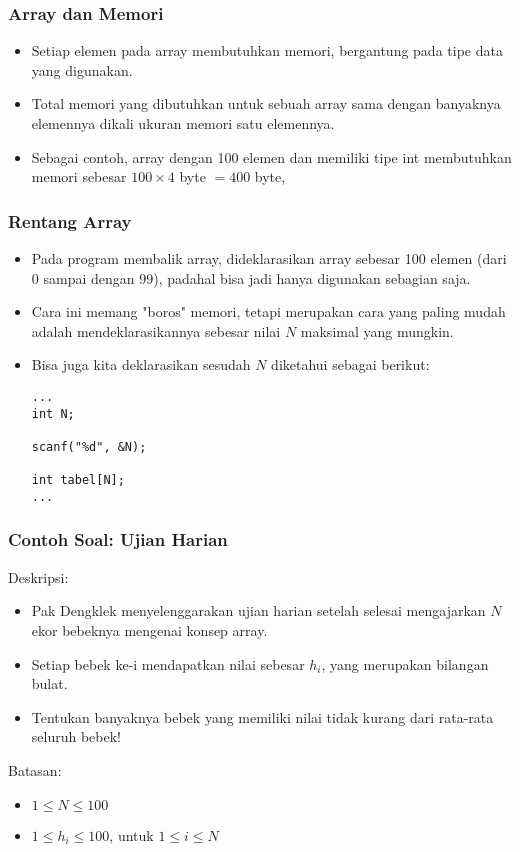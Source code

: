 \begin{frame}
\frametitle{Array dan Memori}
\begin{itemize}
  \item Setiap elemen pada array membutuhkan memori, bergantung pada tipe data yang digunakan.
  \item Total memori yang dibutuhkan untuk sebuah array sama dengan banyaknya elemennya dikali ukuran memori satu elemennya.
  \item Sebagai contoh, array dengan 100 elemen dan memiliki tipe int membutuhkan memori sebesar $100 \times 4$ byte $= 400$ byte,
\end{itemize}
\end{frame}

\begin{frame}[fragile]
\frametitle{Rentang Array}
\begin{itemize}
  \item Pada program membalik array, dideklarasikan array sebesar 100 elemen (dari 0 sampai dengan 99), padahal bisa jadi hanya digunakan sebagian saja.
  \item Cara ini memang "boros" memori, tetapi merupakan cara yang paling mudah adalah mendeklarasikannya sebesar nilai $N$ maksimal yang mungkin.
  \item Bisa juga kita deklarasikan sesudah $N$ diketahui sebagai berikut:
\begin{lstlisting}
...
int N;

scanf("%d", &N);

int tabel[N];
...
\end{lstlisting}
\end{itemize}
\end{frame}

\begin{frame}
\frametitle{Contoh Soal: Ujian Harian}
Deskripsi:
\begin{itemize}
  \item Pak Dengklek menyelenggarakan ujian harian setelah selesai mengajarkan $N$ ekor bebeknya mengenai konsep array.
  \item Setiap bebek ke-i mendapatkan nilai sebesar \textbf{$h_i$}, yang merupakan bilangan bulat.
  \item Tentukan banyaknya bebek yang memiliki nilai tidak kurang dari rata-rata seluruh bebek!
\end{itemize}
Batasan:
\begin{itemize}
  \item $1 \le N \le 100$
  \item $1 \le h_i \le 100$, untuk $1 \le i \le N$
\end{itemize}
\end{frame}

